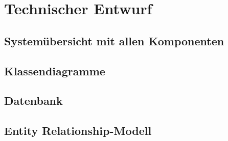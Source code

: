 \section{Technischer Entwurf}
\subsection{Systemübersicht mit allen Komponenten}
\subsection{Klassendiagramme}
\subsection{Datenbank}
\subsection{Entity Relationship-Modell}